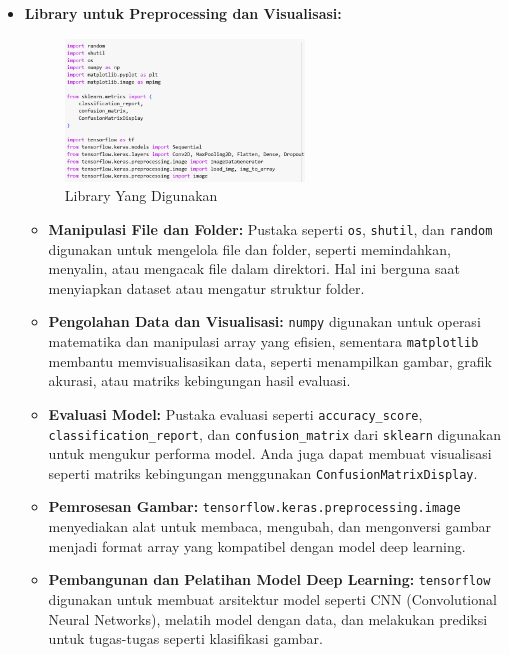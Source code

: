 \documentclass[12pt,a4paper]{article}
\begin{document}
\begin{itemize}
\begin{itemize}
    \item \textbf{Library untuk Preprocessing dan Visualisasi:}
    \begin{figure}[h]
    \centering
    \includegraphics[width=0.6\textwidth]{Image/Import.png}
    \caption{Library Yang Digunakan}
    \label{fig:Library}
\end{figure}
\begin{itemize}
    \item \textbf{Manipulasi File dan Folder:} 
    Pustaka seperti \texttt{os}, \texttt{shutil}, dan \texttt{random} digunakan untuk mengelola file dan folder, seperti memindahkan, menyalin, atau mengacak file dalam direktori. Hal ini berguna saat menyiapkan dataset atau mengatur struktur folder.

    \item \textbf{Pengolahan Data dan Visualisasi:} 
    \texttt{numpy} digunakan untuk operasi matematika dan manipulasi array yang efisien, sementara \texttt{matplotlib} membantu memvisualisasikan data, seperti menampilkan gambar, grafik akurasi, atau matriks kebingungan hasil evaluasi.

   \item \textbf{Evaluasi Model:} 
    Pustaka evaluasi seperti \texttt{accuracy\_score}, \\
    \texttt{classification\_report}, dan \texttt{confusion\_matrix} dari \texttt{sklearn} digunakan untuk mengukur performa model. Anda juga dapat membuat visualisasi seperti matriks kebingungan menggunakan \texttt{ConfusionMatrixDisplay}.


    \item \textbf{Pemrosesan Gambar:} 
    \texttt{tensorflow.keras.preprocessing.image} menyediakan alat untuk membaca, mengubah, dan mengonversi gambar menjadi format array yang kompatibel dengan model deep learning.

    \item \textbf{Pembangunan dan Pelatihan Model Deep Learning:} 
    \texttt{tensorflow} digunakan untuk membuat arsitektur model seperti CNN (Convolutional Neural Networks), melatih model dengan data, dan melakukan prediksi untuk tugas-tugas seperti klasifikasi gambar.


\end{itemize}
\end{itemize}
\end{itemize}
\end{document}
